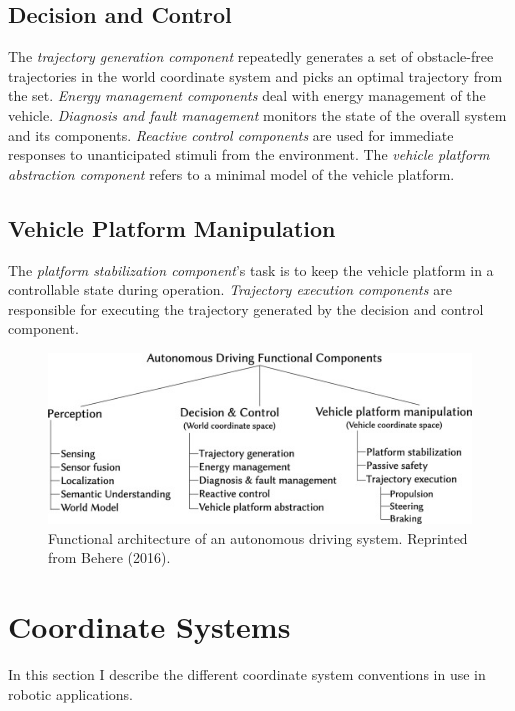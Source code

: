 \subsection{Decision and Control}
The \textit{trajectory generation component} repeatedly generates a set of obstacle-free trajectories in the world coordinate system and picks an optimal trajectory from the set.  \textit{Energy management components} deal with energy management of the vehicle. \textit{Diagnosis and fault management} monitors the state of the overall system and its components. \textit{Reactive control components} are used for immediate responses to unanticipated stimuli from the environment. The \textit{vehicle platform abstraction component} refers to a minimal model of the vehicle platform. 

\subsection{Vehicle Platform Manipulation}

The \textit{platform stabilization component}'s task is to keep the vehicle platform in a controllable state during operation. \textit{Trajectory execution components} are responsible for executing the trajectory generated by the decision and control component. 

\begin{figure}
	\centering
	\includegraphics[width=5in]{figures/fav_autonomous_driving}
	\caption[FAV of Antonomous Driving System.]{\small 
		Functional architecture of an autonomous driving system. Reprinted from Behere (2016). }
	\label{fig:fav_automonous}
\end{figure}

\section{Coordinate Systems}

In this section I describe the different coordinate system conventions in use in robotic applications. 
	
